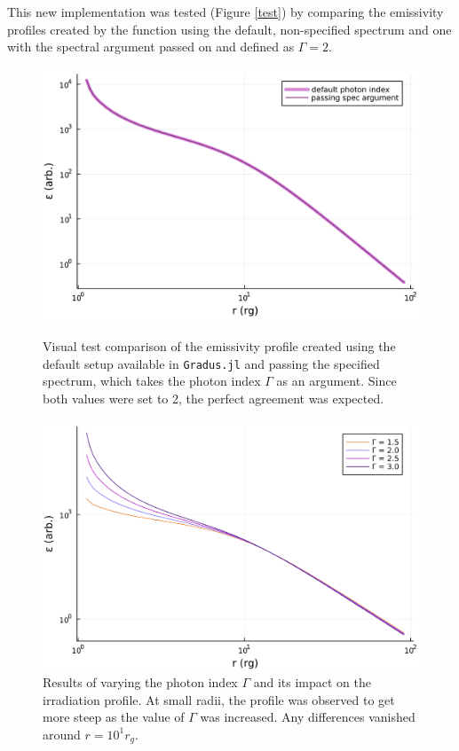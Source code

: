 \documentclass[fleqn,usenatbib,useAMS]{mnras}
\begin{document}
This new implementation was tested (Figure \ref{test}) by comparing the emissivity profiles created by the function using the default, non-specified spectrum and one with the spectral argument passed on and defined as $\Gamma = 2$.

\begin{figure}
\includegraphics[width=\linewidth]{figures/test.png}
\caption{Visual test comparison of the emissivity profile created using the default setup available in {\tt Gradus.jl} and passing the specified spectrum, which takes the photon index $\Gamma$ as an argument. Since both values were set to 2, the perfect agreement was expected.}
\label{test}

\includegraphics[width=\linewidth]{figures/photonindex.png}
\caption{Results of varying the photon index $\Gamma$ and its impact on the irradiation profile. At small radii, the profile was observed to get more steep as the value of $\Gamma$ was increased. Any differences vanished around $r = 10^{1} r_{g}$.}
\label{photonindex}
\end{figure}
\end{document}
